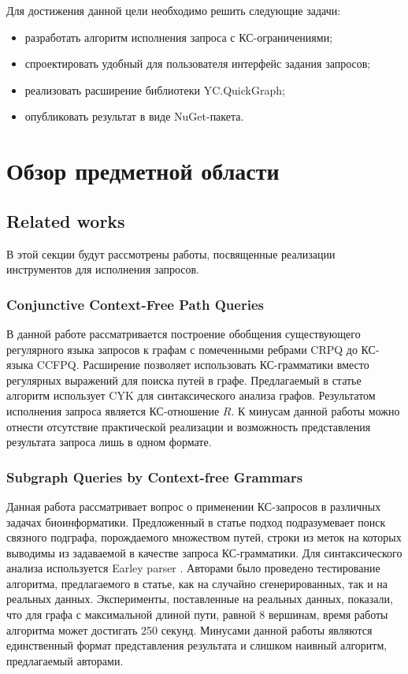 \documentclass[14pt]{matmex-diploma-custom}
\begin{document}
    Для достижения данной цели необходимо решить следующие задачи:
	\begin{itemize}
	    \item разработать алгоритм исполнения запроса с КС-ограничениями;
	    \item спроектировать удобный для пользователя интерфейс задания запросов;
        \item реализовать расширение библиотеки YC.QuickGraph;
        \item опубликовать результат в виде NuGet-пакета.
	\end{itemize}

\section{Обзор предметной области}
	\subsection{Related works}
	В этой секции будут рассмотрены работы, посвященные реализации инструментов для исполнения запросов.
		\subsubsection*{Conjunctive Context-Free Path Queries}
		В данной работе рассматривается построение обобщения существующего регулярного языка запросов к графам с помеченными ребрами CRPQ до КС-языка CCFPQ. Расширение позволяет использовать КС-грамматики вместо регулярных выражений для поиска путей в графе. Предлагаемый в статье алгоритм использует CYK для синтаксического анализа графов. Результатом исполнения запроса является КС-отношение \(R\). К минусам данной работы можно отнести отсутствие практической реализации и возможность представления результата запроса лишь в одном формате.
		\subsubsection*{Subgraph Queries by Context-free Grammars}
		Данная работа рассматривает вопрос о применении КС-запросов в различных задачах биоинформатики. Предложенный в статье подход подразумевает поиск связного подграфа, порождаемого множеством путей, строки из меток на которых выводимы из задаваемой в качестве запроса КС-грамматики. Для синтаксического анализа используется Earley parser \cite{hale2001probabilistic}. Авторами было проведено тестирование алгоритма, предлагаемого в статье, как на случайно сгенерированных, так и на реальных данных. Эксперименты, поставленные на реальных данных, показали, что для графа с максимальной длиной пути, равной 8 вершинам, время работы алгоритма может достигать 250 секунд. Минусами данной работы являются единственный формат представления результата и слишком наивный алгоритм, предлагаемый авторами.
\end{document}

